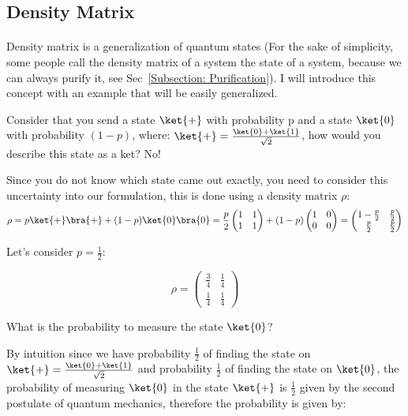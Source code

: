 \subsection{Density Matrix}
\label{Subsection: Density Matrix}
\paragraph{} Density matrix is a generalization of quantum states (For the sake of simplicity, some people call the density matrix of a system the state of a system, because we can always purify it, see Sec~\ref{Subsection: Purification}). I will introduce this concept with an example that will be easily generalized.

Consider that you send a state $\ket{+}$ with probability p and a state $\ket{0}$ with probability $(1-p)$, where: $\ket{+} = \frac{\ket{0} + \ket{1}}{\sqrt{2}}$, how would you describe this state as a ket? No!

Since you do not know which state came out exactly, you need to consider this uncertainty into our formulation, this is done using a density matrix $\rho$:
\begin{equation}
    \rho = p \ket{+} \bra{+} + (1-p) \ket{0} \bra{0} = \frac{p}{2}\begin{pmatrix}
     1 & 1 \\
     1 & 1
    \end{pmatrix} + (1-p) \begin{pmatrix}
    1 & 0 \\
    0 & 0
    \end{pmatrix} = \begin{pmatrix}
    1 - \frac{p}{2} & \frac{p}{2} \\
    \frac{p}{2} & \frac{p}{2}
    \end{pmatrix}
\end{equation}

Let's consider $p = \frac{1}{2}$: 

\begin{equation}
    \rho = \begin{pmatrix}
    \frac{3}{4} & \frac{1}{4} \\
    \frac{1}{4} & \frac{1}{4}
    \end{pmatrix}
\end{equation}

 
What is the probability to measure the state $\ket{0}$? 
 

By intuition since we have probability $\frac{1}{2}$  of finding the state on $\ket{+} = \frac{\ket{0} + \ket{1}}{\sqrt{2}}$  and probability $\frac{1}{2}$  of finding the state on $\ket{0}$, the probability of measuring $\ket{0}$ in the state $\ket{+}$ is $\frac{1}{2}$ given by the second postulate of quantum mechanics, therefore the probability is given by:


